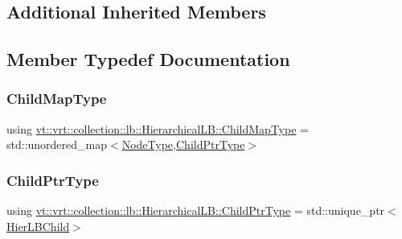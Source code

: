 \subsection*{Additional Inherited Members}


\subsection{Member Typedef Documentation}
\mbox{\label{structvt_1_1vrt_1_1collection_1_1lb_1_1_hierarchical_l_b_a95e5a93033703216cad8ec7a3da7a2ef}} 
\subsubsection{\texorpdfstring{Child\+Map\+Type}{ChildMapType}}
{\footnotesize\ttfamily using \hyperlink{structvt_1_1vrt_1_1collection_1_1lb_1_1_hierarchical_l_b_a95e5a93033703216cad8ec7a3da7a2ef}{vt\+::vrt\+::collection\+::lb\+::\+Hierarchical\+L\+B\+::\+Child\+Map\+Type} =  std\+::unordered\+\_\+map$<$\hyperlink{namespacevt_a866da9d0efc19c0a1ce79e9e492f47e2}{Node\+Type},\hyperlink{structvt_1_1vrt_1_1collection_1_1lb_1_1_hierarchical_l_b_a4dd8525145427a29350a287a777655de}{Child\+Ptr\+Type}$>$}

\mbox{\label{structvt_1_1vrt_1_1collection_1_1lb_1_1_hierarchical_l_b_a4dd8525145427a29350a287a777655de}} 
\subsubsection{\texorpdfstring{Child\+Ptr\+Type}{ChildPtrType}}
{\footnotesize\ttfamily using \hyperlink{structvt_1_1vrt_1_1collection_1_1lb_1_1_hierarchical_l_b_a4dd8525145427a29350a287a777655de}{vt\+::vrt\+::collection\+::lb\+::\+Hierarchical\+L\+B\+::\+Child\+Ptr\+Type} =  std\+::unique\+\_\+ptr$<$\hyperlink{structvt_1_1vrt_1_1collection_1_1lb_1_1_hier_l_b_child}{Hier\+L\+B\+Child}$>$}

